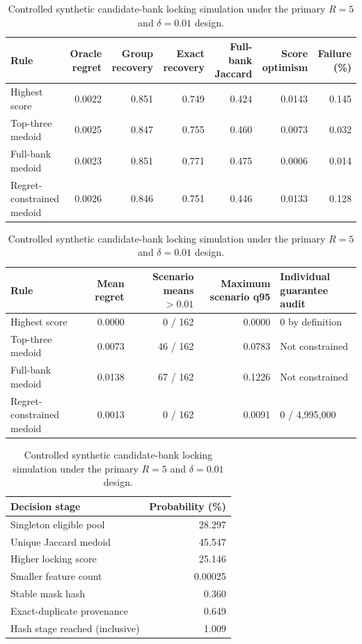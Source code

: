 \begin{table}[H]
\centering
\caption{Controlled synthetic candidate-bank locking simulation under the primary $R=5$ and $\delta=0.01$ design.}
\label{tab:supp23}
\scriptsize
{}
\setlength{\tabcolsep}{3.2pt}
\begin{tabular}{lrrrrrr}
\toprule
Rule & Oracle regret & Group recovery & Exact recovery & Full-bank Jaccard & Score optimism & Failure (\%) \\
\midrule
Highest score & 0.0022 & 0.851 & 0.749 & 0.424 & 0.0143 & 0.145 \\
Top-three medoid & 0.0025 & 0.847 & 0.755 & 0.460 & 0.0073 & 0.032 \\
Full-bank medoid & 0.0023 & 0.851 & 0.771 & 0.475 & 0.0006 & 0.014 \\
Regret-constrained medoid & 0.0026 & 0.846 & 0.751 & 0.446 & 0.0133 & 0.128 \\
\bottomrule
\end{tabular}

\medskip
{}
\setlength{\tabcolsep}{4.0pt}
\begin{tabular}{lrrrp{31mm}}
\toprule
Rule & Mean regret & Scenario means $>0.01$ & Maximum scenario q95 & Individual guarantee audit \\
\midrule
Highest score & 0.0000 & 0 / 162 & 0.0000 & 0 by definition \\
Top-three medoid & 0.0073 & 46 / 162 & 0.0783 & Not constrained \\
Full-bank medoid & 0.0138 & 67 / 162 & 0.1226 & Not constrained \\
Regret-constrained medoid & 0.0013 & 0 / 162 & 0.0091 & 0 / 4,995,000 \\
\bottomrule
\end{tabular}

\medskip
{}
\begin{tabular}{lr}
\toprule
Decision stage & Probability (\%) \\
\midrule
Singleton eligible pool & 28.297 \\
Unique Jaccard medoid & 45.547 \\
Higher locking score & 25.146 \\
Smaller feature count & 0.00025 \\
Stable mask hash & 0.360 \\
Exact-duplicate provenance & 0.649 \\
Hash stage reached (inclusive) & 1.009 \\
\bottomrule
\end{tabular}


\end{table}
